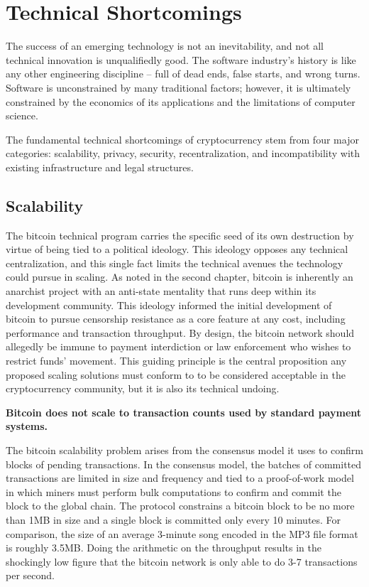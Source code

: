 \chapter{Technical Shortcomings}

The success of an emerging technology is not an inevitability, and not all
technical innovation is unqualifiedly good. The software industry's history is
like any other engineering discipline -- full of dead ends, false starts, and
wrong turns. Software is unconstrained by many traditional factors; however, it
is ultimately constrained by the economics of its applications and the
limitations of computer science.

The fundamental technical shortcomings of cryptocurrency stem from four major
categories: scalability, privacy, security, recentralization, and
incompatibility with existing infrastructure and legal structures.

\section{Scalability}

The bitcoin technical program carries the specific seed of its own destruction
by virtue of being tied to a political ideology. This ideology opposes any
technical centralization, and this single fact limits the technical avenues the
technology could pursue in scaling. As noted in the second chapter, bitcoin is
inherently an anarchist project with an anti-state mentality that runs deep
within its development community. This ideology informed the initial development
of bitcoin to pursue censorship resistance as a core feature at any cost,
including performance and transaction throughput. By design, the bitcoin network
should allegedly be immune to payment interdiction or law enforcement who wishes
to restrict funds' movement. This guiding principle is the central proposition
any proposed scaling solutions must conform to to be considered acceptable in
the cryptocurrency community, but it is also its technical undoing.

\begin{infobox}
 \textbf{Bitcoin does not scale to transaction counts used by standard payment systems.}
\end{infobox}

The bitcoin scalability problem arises from the consensus model it uses to
confirm blocks of pending transactions. In the consensus model, the batches of
committed transactions are limited in size and frequency and tied to a
proof-of-work model in which miners must perform bulk computations to confirm
and commit the block to the global chain. The protocol constrains a bitcoin
block to be no more than 1MB in size and a single block is committed only every
10 minutes. For comparison, the size of an average 3-minute song encoded in the
MP3 file format is roughly 3.5MB. Doing the arithmetic on the throughput results
in the shockingly low figure that the bitcoin network is only able to do 3-7
transactions per second.


